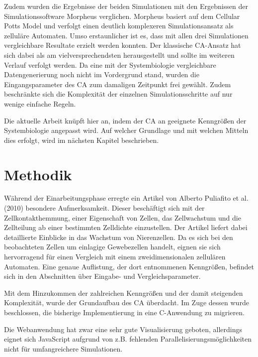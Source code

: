 \documentclass[11pt,a4paper,pointlessnumbers]{scrreprt}  %
\newcommand{\CS}{C\nolinebreak\hspace{-.05em}\raisebox{.6ex}{\scriptsize\bf \#}}
\begin{document}
Zudem wurden die Ergebnisse der beiden Simulationen mit den Ergebnissen der Simulationssoftware Morpheus verglichen. Morpheus basiert auf dem Cellular Potts Model und verfolgt einen deutlich komplexeren Simulationsansatz als zelluläre Automaten. Umso erstaunlicher ist es, dass mit allen drei Simulationen vergleichbare Resultate erzielt werden konnten. Der klassische CA-Ansatz hat sich dabei als am vielversprechendsten herausgestellt und sollte im weiteren Verlauf verfolgt werden. Da eine mit der Systembiologie vergleichbare Datengenerierung noch nicht im Vordergrund stand, wurden die Eingangsparameter des CA zum damaligen Zeitpunkt frei gewählt. Zudem beschränkte sich die Komplexität der einzelnen Simulationsschritte auf nur wenige einfache Regeln.\par
 
Die aktuelle Arbeit knüpft hier an, indem der CA an geeignete Kenngrößen der Systembiologie angepasst wird. Auf welcher Grundlage und mit welchen Mitteln dies erfolgt, wird im nächsten Kapitel beschrieben.

\chapter{Methodik}

Während der Einarbeitungsphase erregte ein Artikel von Alberto Puliafito et al. (2010) \cite{Puliafito} besondere Aufmerksamkeit. Dieser beschäftigt sich mit der Zellkontakthemmung, einer Eigenschaft von Zellen, das Zellwachstum und die Zellteilung ab einer bestimmten Zelldichte einzustellen. Der Artikel liefert dabei detaillierte Einblicke in das Wachstum von Nierenzellen. Da es sich bei den beobachteten Zellen um einlagige Gewebezellen handelt, eignen sie sich hervorragend für einen Vergleich mit einem zweidimensionalen zellulären Automaten. Eine genaue Auflistung, der dort entnommenen Kenngrößen, befindet sich in den Abschnitten über Eingabe- und Vergleichsparameter. \par 

Mit dem Hinzukommen der zahlreichen Kenngrößen und der damit steigenden Komplexität, wurde der Grundaufbau des CA überdacht. Im Zuge dessen wurde beschlossen, die bisherige Implementierung in eine \CS  -Anwendung zu migrieren. \par

Die Webanwendung hat zwar eine sehr gute Visualisierung geboten, allerdings eignet sich JavaScript aufgrund von z.B. fehlenden Parallelisierungsmöglichkeiten nicht für umfangreichere Simulationen. \par
\end{document}
